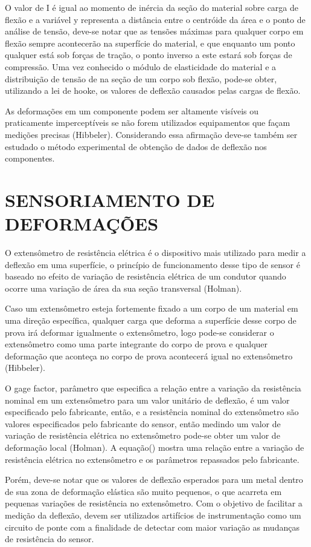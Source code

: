 O valor de I é igual ao momento de inércia da seção do material sobre carga de flexão e a variável y representa a distância entre o centróide da área e o ponto de análise de tensão, deve-se notar que as tensões máximas para qualquer corpo em flexão sempre acontecerão na superfície do material, e que enquanto um ponto qualquer está sob forças de tração, o ponto inverso a este estará sob forças de compressão. Uma vez conhecido o módulo de elasticidade do material e a distribuição de tensão de na seção de um corpo sob flexão, pode-se obter, utilizando a lei de hooke, os valores de deflexão causados pelas cargas de flexão.

As deformações em um componente podem ser altamente visíveis ou praticamente imperceptíveis se não forem utilizados equipamentos que façam medições precisas (Hibbeler). Considerando essa afirmação deve-se também ser estudado o método experimental de obtenção de dados de deflexão nos componentes.

\section{SENSORIAMENTO DE DEFORMAÇÕES}

O extensômetro de resistência elétrica é o dispositivo mais utilizado para medir a deflexão em uma superfície, o princípio de funcionamento desse tipo de sensor é baseado no efeito de variação de resistência elétrica de um condutor quando ocorre uma variação de área da sua seção transversal (Holman).

Caso um extensômetro esteja fortemente fixado a um corpo de um material em uma direção específica, qualquer carga que deforma a superfície desse corpo de prova irá deformar igualmente o extensômetro, logo pode-se considerar o extensômetro como uma parte integrante do corpo de prova e qualquer deformação que aconteça no corpo de prova acontecerá igual no extensômetro (Hibbeler).

O gage factor, parâmetro que especifica a relação entre a variação da resistência nominal em um extensômetro para um valor unitário de deflexão, é um valor especificado pelo fabricante, então, e a resistência nominal do extensômetro são valores especificados pelo fabricante do sensor, então medindo um valor de variação de resistência elétrica no extensômetro pode-se obter um valor de deformação local (Holman). A equação() mostra uma relação entre a variação de resistência elétrica no extensômetro e os parâmetros repassados pelo fabricante.

Porém, deve-se notar que os valores de deflexão esperados para um metal dentro de sua zona de deformação elástica são muito pequenos, o que acarreta em pequenas variações de resistência no extensômetro. Com o objetivo de facilitar a medição da deflexão, devem ser utilizados artifícios de instrumentação como um circuito de ponte com a finalidade de detectar com maior variação as mudanças de resistência do sensor.

